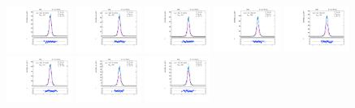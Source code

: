 \begin{figure}[htb]
\includegraphics[width=0.19\textwidth]{plots/Appendix_Recoil_Fits/ZmmMC_PF_5TeV_2G/pfu2fit_24.pdf}
\includegraphics[width=0.19\textwidth]{plots/Appendix_Recoil_Fits/ZmmMC_PF_5TeV_2G/pfu2fit_25.pdf}
\includegraphics[width=0.19\textwidth]{plots/Appendix_Recoil_Fits/ZmmMC_PF_5TeV_2G/pfu2fit_26.pdf}
\includegraphics[width=0.19\textwidth]{plots/Appendix_Recoil_Fits/ZmmMC_PF_5TeV_2G/pfu2fit_27.pdf}
\includegraphics[width=0.19\textwidth]{plots/Appendix_Recoil_Fits/ZmmMC_PF_5TeV_2G/pfu2fit_28.pdf}
\includegraphics[width=0.19\textwidth]{plots/Appendix_Recoil_Fits/ZmmMC_PF_5TeV_2G/pfu2fit_29.pdf}
\includegraphics[width=0.19\textwidth]{plots/Appendix_Recoil_Fits/ZmmMC_PF_5TeV_2G/pfu2fit_30.pdf}
\includegraphics[width=0.19\textwidth]{plots/Appendix_Recoil_Fits/ZmmMC_PF_5TeV_2G/pfu2fit_31.pdf}

\end{figure}

